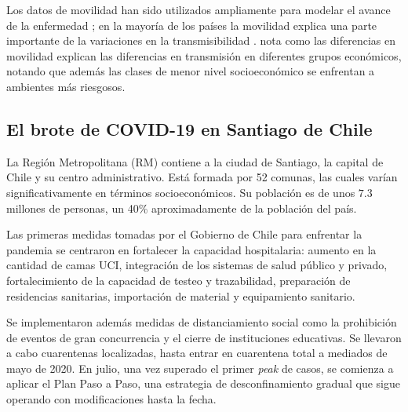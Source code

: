 Los datos de movilidad han sido utilizados ampliamente para modelar el avance de la enfermedad \cite{Lai2020}\cite{Kraemer2020}\cite{Chinazzi2020}; en la mayoría de los países la movilidad explica una parte importante de la variaciones en la transmisibilidad \cite{Nouvellet2021}. \cite{Chang2021} nota como las diferencias en movilidad explican las diferencias en transmisión en diferentes grupos económicos, notando que además las clases de menor nivel socioeconómico se enfrentan a ambientes más riesgosos.




\subsection{El brote de COVID-19 en Santiago de Chile }

La Región Metropolitana (RM) contiene a la ciudad de Santiago, la capital de Chile y su centro administrativo. Está formada por 52 comunas, las cuales varían significativamente en términos socioeconómicos. Su población es de unos \(7.3\) millones de personas, un 40\% aproximadamente de la población del país.

Las primeras medidas tomadas por el Gobierno de Chile para enfrentar la pandemia se centraron en fortalecer la capacidad hospitalaria: aumento en la cantidad de camas UCI, integración de los sistemas de salud público y privado, fortalecimiento de la capacidad de testeo y trazabilidad, preparación de residencias sanitarias, importación de material y equipamiento sanitario.

Se implementaron además \cite{Tariq2021a} medidas de distanciamiento social como la prohibición de eventos de gran concurrencia y el cierre de instituciones educativas. Se llevaron a cabo cuarentenas localizadas, hasta entrar en cuarentena total a mediados de mayo de 2020. En julio, una vez superado el primer \textit{peak} de casos, se comienza a aplicar el Plan Paso a Paso, una estrategia de desconfinamiento  gradual que sigue operando con modificaciones hasta la fecha.

